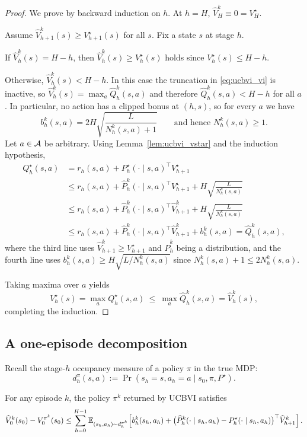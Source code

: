 \begin{proof}
We prove by backward induction on $h$.
At $h=H$, $\widehat V_H^k\equiv 0=V_H^\star$.

Assume $\widehat V_{h+1}^k(s)\ge V_{h+1}^\star(s)$ for all $s$.
Fix a state $s$ at stage $h$.

If $\widehat V_h^k(s)=H-h$, then $\widehat V_h^k(s)\ge V_h^\star(s)$ holds since $V_h^\star(s)\le H-h$.

Otherwise, $\widehat V_h^k(s)<H-h$. In this case the truncation in \eqref{eq:ucbvi_vi} is inactive,
so $\widehat V_h^k(s)=\max_a \widehat Q_h^k(s,a)$ and therefore $\widehat Q_h^k(s,a)<H-h$ for all $a$.
In particular, no action has a clipped bonus at $(h,s)$, so for every $a$ we have
\[
b_h^k(s,a)=2H\sqrt{\frac{L}{N_h^k(s,a)+1}}
\qquad\text{and hence } N_h^k(s,a)\ge 1.
\]
Let $a\in\mathcal{A}$ be arbitrary. Using Lemma~\ref{lem:ucbvi_vstar} and the induction hypothesis,
\begin{align*}
Q_h^\star(s,a)
&= r_h(s,a) + P_h^\star(\cdot\mid s,a)^\top V_{h+1}^\star\\
&\le r_h(s,a) + \widehat P_h^k(\cdot\mid s,a)^\top V_{h+1}^\star
      + H\sqrt{\frac{L}{N_h^k(s,a)}}\\
&\le r_h(s,a) + \widehat P_h^k(\cdot\mid s,a)^\top \widehat V_{h+1}^k
      + H\sqrt{\frac{L}{N_h^k(s,a)}}\\
&\le r_h(s,a) + \widehat P_h^k(\cdot\mid s,a)^\top \widehat V_{h+1}^k
      + b_h^k(s,a)
= \widehat Q_h^k(s,a),
\end{align*}
where the third line uses $\widehat V_{h+1}^k\ge V_{h+1}^\star$ and $\widehat P_h^k$ being a distribution,
and the fourth line uses $b_h^k(s,a)\ge H\sqrt{L/N_h^k(s,a)}$ since $N_h^k(s,a)+1\le 2N_h^k(s,a)$.

Taking maxima over $a$ yields
\[
V_h^\star(s)=\max_a Q_h^\star(s,a)\ \le\ \max_a \widehat Q_h^k(s,a)=\widehat V_h^k(s),
\]
completing the induction.
\end{proof}

\subsection{A one-episode decomposition}

Recall the stage-$h$ occupancy measure of a policy $\pi$ in the true MDP:
\[
d_h^\pi(s,a) := \Pr(s_h=s,a_h=a\mid s_0,\pi,P^\star).
\]

\begin{lemma}
\label{lem:ucbvi_decomp}
For any episode $k$, the policy $\pi^k$ returned by UCBVI satisfies
\[
\widehat V_0^k(s_0) - V_0^{\pi^k}(s_0)
\le
\sum_{h=0}^{H-1}\mathbb{E}_{(s_h,a_h)\sim d_h^{\pi^k}}\!\left[
b_h^k(s_h,a_h) + \big(\widehat P_h^k(\cdot\mid s_h,a_h)-P_h^\star(\cdot\mid s_h,a_h)\big)^\top \widehat V_{h+1}^k
\right].
\]
\end{lemma}

